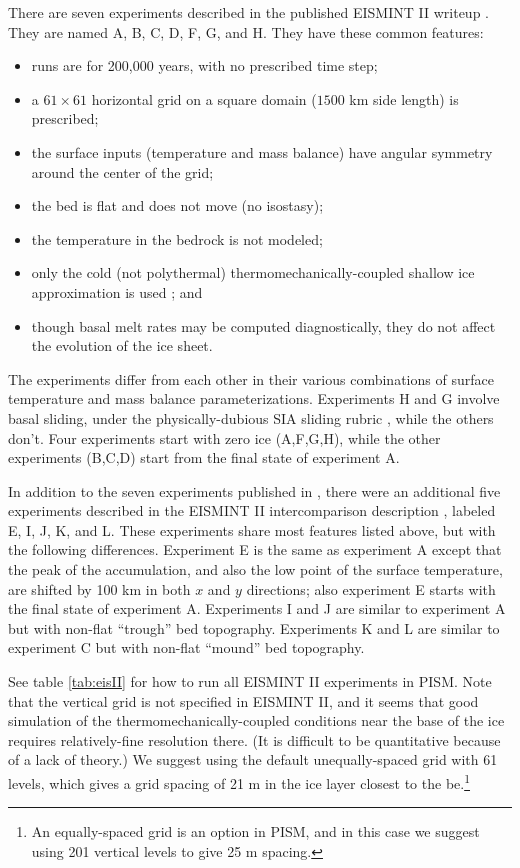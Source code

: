 There are seven experiments described in the published EISMINT II writeup \cite{EISMINT00}.  They are named A, B, C, D, F, G, and H.  They have these common features:\begin{itemize}
\item runs are for 200,000 years, with no prescribed time step;
\item a $61\times 61$ horizontal grid on a square domain ($1500$ km side length) is prescribed;
\item the surface inputs (temperature and mass balance) have angular symmetry around the center of the grid;
\item the bed is flat and does not move (no isostasy);
\item the temperature in the bedrock is not modeled;
\item only the cold (not polythermal) thermomechanically-coupled shallow ice approximation is used \cite{EISMINT00}; and
\item though basal melt rates may be computed diagnostically, they do not affect the evolution of the ice sheet.
\end{itemize}
The experiments differ from each other in their various combinations of surface temperature and mass balance parameterizations.  Experiments H and G involve basal sliding, under the physically-dubious SIA sliding rubric \cite[Appendix B]{BBssasliding}, while the others don't.  Four experiments start with zero ice (A,F,G,H), while the other experiments (B,C,D) start from the final state of experiment A.

In addition to the seven experiments published in \cite{EISMINT00}, there were an additional five experiments described in the EISMINT II intercomparison description 
\cite{EISIIdescribe}, labeled E, I, J, K, and L.  These experiments share most features listed above, but with the following differences.  Experiment E is the same as experiment A except that the peak of the accumulation, and also the low point of the surface temperature, are shifted by 100 km in both $x$ and $y$ directions; also experiment E starts with the final state of experiment A.  Experiments I and J are similar to experiment A but with non-flat ``trough'' bed topography.  Experiments K and L are similar to experiment C but with non-flat ``mound'' bed topography.

See table \ref{tab:eisII} for how to run all EISMINT II experiments in PISM.  Note that the vertical grid is not specified in EISMINT II, and it seems that good simulation of the thermomechanically-coupled conditions near the base of the ice requires relatively-fine resolution there.  (It is difficult to be quantitative because of a lack of theory.)  We suggest using the default unequally-spaced grid with 61 levels, which gives a grid spacing of 21 m in the ice layer closest to the be.\footnote{An equally-spaced grid is an option in PISM, and in this case we suggest using 201 vertical levels to give 25 m spacing.}

